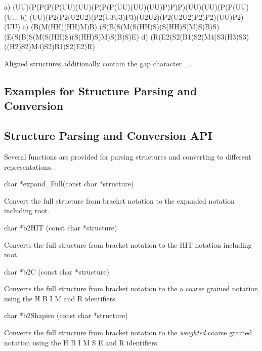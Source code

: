 \begin{DoxyVerb}a) (UU)(P(P(P(P(UU)(UU)(P(P(P(UU)(UU)(UU)P)P)P)(UU)(UU)(P(P(UU)(U...
b) (UU)(P2(P2(U2U2)(P2(U3U3)P3)(U2U2)(P2(U2U2)P2)P2)(UU)P2)(UU)
c) (B(M(HH)(HH)M)B)
   (S(B(S(M(S(HH)S)(S(HH)S)M)S)B)S)
   (E(S(B(S(M(S(HH)S)(S(HH)S)M)S)B)S)E)
d) (R(E2(S2(B1(S2(M4(S3(H3)S3)((H2)S2)M4)S2)B1)S2)E2)R)
\end{DoxyVerb}


Aligned structures additionally contain the gap character \textquotesingle{}\+\_\+\textquotesingle{}.\hypertarget{rna_structure_notations_structure_notations_examples}{}\subsection{Examples for Structure Parsing and Conversion}\label{rna_structure_notations_structure_notations_examples}
\hypertarget{rna_structure_notations_structure_notations_api}{}\subsection{Structure Parsing and Conversion A\+PI}\label{rna_structure_notations_structure_notations_api}
Several functions are provided for parsing structures and converting to different representations.

\begin{DoxyVerb}char  *expand_Full(const char *structure)
\end{DoxyVerb}
 Convert the full structure from bracket notation to the expanded notation including root.

\begin{DoxyVerb}char *b2HIT (const char *structure)
\end{DoxyVerb}
 Converts the full structure from bracket notation to the H\+IT notation including root.

\begin{DoxyVerb}char *b2C (const char *structure)
\end{DoxyVerb}
 Converts the full structure from bracket notation to the a coarse grained notation using the \textquotesingle{}H\textquotesingle{} \textquotesingle{}B\textquotesingle{} \textquotesingle{}I\textquotesingle{} \textquotesingle{}M\textquotesingle{} and \textquotesingle{}R\textquotesingle{} identifiers.

\begin{DoxyVerb}char *b2Shapiro (const char *structure)
\end{DoxyVerb}
 Converts the full structure from bracket notation to the {\itshape weighted} coarse grained notation using the \textquotesingle{}H\textquotesingle{} \textquotesingle{}B\textquotesingle{} \textquotesingle{}I\textquotesingle{} \textquotesingle{}M\textquotesingle{} \textquotesingle{}S\textquotesingle{} \textquotesingle{}E\textquotesingle{} and \textquotesingle{}R\textquotesingle{} identifiers.

